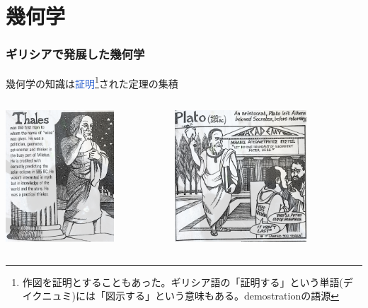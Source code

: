 \documentclass[unicode, 14pt, aspectratio=169]{beamer}
\begin{document}
\section{幾何学}
\begin{frame}
  \frametitle{ギリシアで発展した幾何学}
  {\large 幾何学の知識は\textcolor{highlight}{証明}\footnote{作図を証明とすることもあった。ギリシア語の「証明する」という単語(デイクニュミ)には「図示する」という意味もある。demostrationの語源}された定理の集積}
\begin{columns}
  \begin{column}{0.25\textwidth}
    \begin{center}
      \includegraphics[width=0.7\textwidth]{images/thales.png}
    \end{center}
  \end{column}
  \begin{column}{0.25\textwidth}
    \begin{center}
      \includegraphics[width=0.7\textwidth]{images/plato.png}

\end{center}
\end{column}
\end{columns}
\end{frame}
\end{document}
